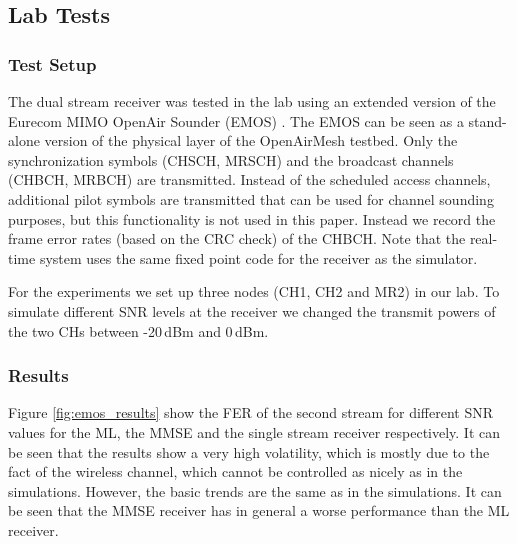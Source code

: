 \documentclass[a4paper,twocolumn,journal]{IEEEtran}
\begin{document}
\subsection{Lab Tests}
\label{sec:lab}

\subsubsection{Test Setup}

The dual stream receiver was tested in the lab using an extended version of the Eurecom MIMO OpenAir Sounder (EMOS) \cite{kaltenberger09}. The EMOS can be seen as a stand-alone version of the physical layer of the OpenAirMesh testbed. Only the synchronization symbols (CHSCH, MRSCH) and the broadcast channels (CHBCH, MRBCH) are transmitted. Instead of the scheduled access channels, additional pilot symbols are transmitted that can be used for channel sounding purposes, but this functionality is not used in this paper. Instead we record the frame error rates (based on the CRC check) of the CHBCH. Note that the real-time system uses the same fixed point code for the receiver as the simulator.

For the experiments we set up three nodes (CH1, CH2 and MR2) in our lab. To simulate different SNR levels at the receiver we changed the transmit powers of the two CHs between -20\,dBm and 0\,dBm. 

\subsubsection{Results}

Figure \ref{fig:emos_results} show the FER of the second stream for different SNR values for the ML, the MMSE and the single stream receiver respectively. It can be seen that the results show a very high volatility, which is mostly due to the fact of the wireless channel, which cannot be controlled as nicely as in the simulations. However, the basic trends are the same as in the simulations. It can be seen that the MMSE receiver has in general a worse performance than the ML receiver. 

% 
% 
\end{document}

